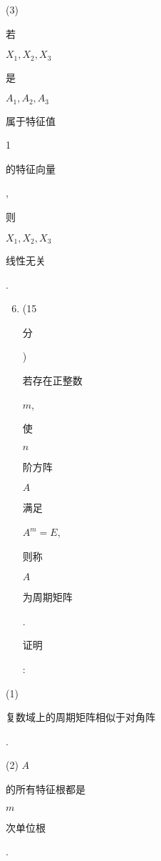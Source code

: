 \documentclass[10pt]{article}
\begin{document}
(3) \begin{CJK}{UTF8}{mj}若\end{CJK} $X_{1}, X_{2}, X_{3}$ \begin{CJK}{UTF8}{mj}是\end{CJK} $A_{1}, A_{2}, A_{3}$ \begin{CJK}{UTF8}{mj}属于特征值\end{CJK} 1 \begin{CJK}{UTF8}{mj}的特征向量\end{CJK}, \begin{CJK}{UTF8}{mj}则\end{CJK} $X_{1}, X_{2}, X_{3}$ \begin{CJK}{UTF8}{mj}线性无关\end{CJK}.

\begin{enumerate}
  \setcounter{enumi}{5}
  \item (15 \begin{CJK}{UTF8}{mj}分\end{CJK}) \begin{CJK}{UTF8}{mj}若存在正整数\end{CJK} $m$, \begin{CJK}{UTF8}{mj}使\end{CJK} $n$ \begin{CJK}{UTF8}{mj}阶方阵\end{CJK} $A$ \begin{CJK}{UTF8}{mj}满足\end{CJK} $A^{m}=E$, \begin{CJK}{UTF8}{mj}则称\end{CJK} $A$ \begin{CJK}{UTF8}{mj}为周期矩阵\end{CJK}. \begin{CJK}{UTF8}{mj}证明\end{CJK}:
\end{enumerate}
(1) \begin{CJK}{UTF8}{mj}复数域上的周期矩阵相似于对角阵\end{CJK}.

(2) $A$ \begin{CJK}{UTF8}{mj}的所有特征根都是\end{CJK} $m$ \begin{CJK}{UTF8}{mj}次单位根\end{CJK}.
\end{document}
